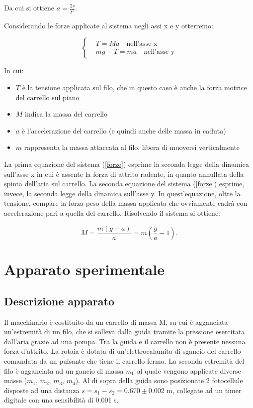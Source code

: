 \documentclass[11pt,a4paper]{article}
\begin{document}
Da cui si ottiene $a=\frac{2s}{t^2}$.



Considerando le forze applicate al sistema negli assi x e y otterremo:

\begin{equation}
    \begin{cases}
    &T=Ma \quad \text{nell'asse x} \\
    &mg-T=ma \quad \text{nell'asse y}
    \end{cases}
\label{forze}
\end{equation}

In cui:
\begin{itemize}
    \item{$T$ è la tensione applicata sul filo, che in questo caso è anche la forza motrice del carrello sul piano}
    \item{$M$ indica la massa del carrello}
    \item{$a$ è l'accelerazione del carrello (e quindi anche delle massa in caduta)}
    \item{$m$ rappresenta la massa attaccata al filo, libera di muoversi verticalmente}
\end{itemize}
La prima equazione del sistema (\ref{forze}) esprime la seconda legge della dinamica sull'asse x in cui è assente la forza di attrito radente, in quanto annullata della spinta dell'aria sul carrello.
La seconda equazione del sistema (\ref{forze}) esprime, invece, la seconda legge della dinamica sull'asse y. In quest'equazione, oltre la tensione, compare la forza peso della massa applicata che ovviamente cadrà con accelerazione pari a quella del carrello.
Risolvendo il sistema si ottiene:

\begin{equation}
   M=\frac{m(g-a)}{a}=m \left( \frac{g}{a}-1\right).
\end{equation}

\section{Apparato sperimentale}
\subsection{Descrizione apparato}
Il macchinario è costituito da un carrello di massa M, su cui è agganciata un'estremità di un filo, che si solleva dalla guida tramite la pressione esercitata dall'aria grazie ad una pompa. Tra la guida e il carrello non è presente nessuna forza d'attrito. La rotaia è dotata di un’elettrocalamita di sgancio del carrello comandata da un pulsante che tiene il carrello fermo. La seconda estremità del filo è agganciata ad un gancio di massa $m_0$ al quale vengono applicate diverse masse ($m_1$, $m_2$, $m_3$, $m_4$). Al di sopra della guida sono posizionate 2 fotocellule disposte ad una distanza $s=s_1-s_2=0.670 \pm 0.002$ m, collegate ad un timer digitale con una sensibilità di 0.001 s.
\end{document}
